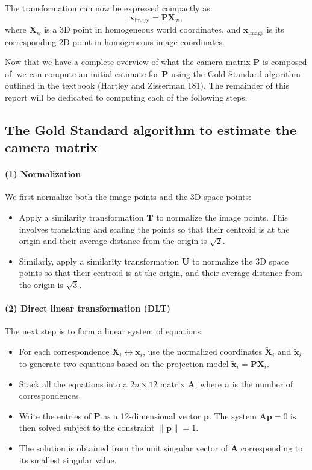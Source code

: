 \documentclass[12pt]{article}
\begin{document}
The transformation can now be expressed compactly as:
$$
\mathbf{x}_{\text{image}} = \mathbf{P} \mathbf{X}_{\text{w}},
$$
where $\mathbf{X}_{\text{w}}$ is a 3D point in homogeneous world coordinates, and $\mathbf{x}_{\text{image}}$ is its corresponding 2D point in homogeneous image coordinates.

Now that we have a complete overview of what the camera matrix $ \mathbf{P} $ is composed of, we can compute an initial estimate for $ \mathbf{P} $ using the Gold Standard algorithm outlined in the textbook (Hartley and Zisserman 181). The remainder of this report will be dedicated to computing each of the following steps.

\subsection{The Gold Standard algorithm to estimate the camera matrix}

\paragraph{(1) Normalization}
We first normalize both the image points and the 3D space points:
\begin{itemize}
    \item Apply a similarity transformation $ \mathbf{T} $ to normalize the image points. This involves translating and scaling the points so that their centroid is at the origin and their average distance from the origin is $\sqrt{2}$.
    \item Similarly, apply a similarity transformation $ \mathbf{U} $ to normalize the 3D space points so that their centroid is at the origin, and their average distance from the origin is $\sqrt{3}$.
\end{itemize}

\paragraph{(2) Direct linear transformation (DLT)}
The next step is to form a linear system of equations:
\begin{itemize}
    \item For each correspondence $ \mathbf{X}_i \leftrightarrow \mathbf{x}_i $, use the normalized coordinates $ \tilde{\mathbf{X}}_i $ and $ \tilde{\mathbf{x}}_i $ to generate two equations based on the projection model $ \tilde{\mathbf{x}}_i = \mathbf{P} \tilde{\mathbf{X}}_i $.
    \item Stack all the equations into a $ 2n \times 12 $ matrix $ \mathbf{A} $, where $ n $ is the number of correspondences.
    \item Write the entries of $ \mathbf{P} $ as a 12-dimensional vector $ \mathbf{p} $. The system $ \mathbf{A} \mathbf{p} = 0 $ is then solved subject to the constraint $ \| \mathbf{p} \| = 1 $.
    \item The solution is obtained from the unit singular vector of $ \mathbf{A} $ corresponding to its smallest singular value.
\end{itemize}
\end{document}
